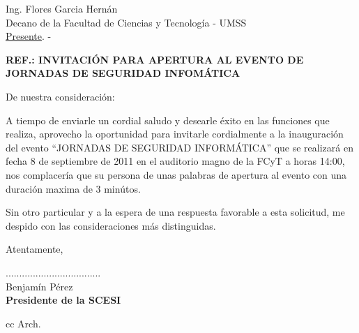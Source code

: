 \documentclass[letterpaper,12pt]{letter}
\begin{document}
\date {6 de septiembre de 2011}

\begin{letter}{ Ing. Flores Garcia Hernán \\ Decano de la Facultad de Ciencias y Tecnolog\'ia - UMSS \\ \underline {Presente}. -}

\begin{center}
	\opening{\textbf{REF.: INVITACI\'ON PARA APERTURA AL EVENTO DE JORNADAS DE SEGURIDAD INFOM\'ATICA}}
\end{center}

De nuestra consideración:

A tiempo de enviarle un cordial saludo y desearle éxito en las funciones que realiza, aprovecho la oportunidad para invitarle 
cordialmente a la inauguraci\'on del evento ``JORNADAS DE SEGURIDAD INFORMÁTICA'' que se realizar\'a en fecha 8 de septiembre 
de 2011 en el auditorio magno de la FCyT a horas 14:00, nos complacer\'ia que su persona de unas palabras de apertura al evento 
con una duraci\'on maxima de 3 min\'utos.
             
Sin otro particular y a la espera de una respuesta favorable a esta solicitud, me despido con las consideraciones más distinguidas.

Atentamente,

\vspace{5cm}

\begin{center}
...................................\\
Benjam\'in P\'erez\\
{\bfseries Presidente de la  SCESI}
\end{center}
\vspace{2cm}
cc Arch.
\end{letter}
\end{document}

